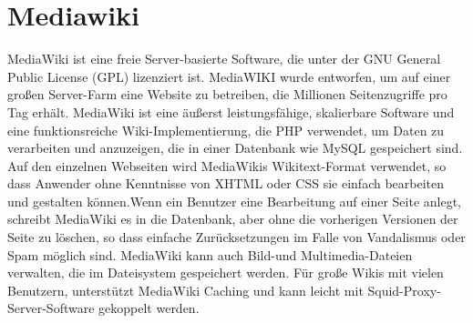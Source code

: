 
\section{Mediawiki}
MediaWiki ist eine freie Server-basierte Software, die unter der GNU General Public License (GPL) lizenziert ist. MediaWIKI wurde entworfen, um auf einer großen Server-Farm eine Website zu betreiben, die Millionen Seitenzugriffe pro Tag erhält. MediaWiki ist eine äußerst leistungsfähige, skalierbare Software und eine funktionsreiche Wiki-Implementierung, die PHP verwendet, um Daten zu verarbeiten und anzuzeigen, die in einer Datenbank wie MySQL gespeichert sind. Auf den einzelnen Webseiten wird MediaWikis Wikitext-Format verwendet, so dass Anwender ohne Kenntnisse von XHTML oder CSS sie einfach bearbeiten und gestalten können.Wenn ein Benutzer eine Bearbeitung auf einer Seite anlegt, schreibt MediaWiki es in die Datenbank, aber ohne die vorherigen Versionen der Seite zu löschen, so dass einfache Zurücksetzungen im Falle von Vandalismus oder Spam möglich sind. MediaWiki kann auch Bild-und Multimedia-Dateien verwalten, die im Dateisystem gespeichert werden. Für große Wikis mit vielen Benutzern, unterstützt MediaWiki Caching und kann leicht mit Squid-Proxy-Server-Software gekoppelt werden.
